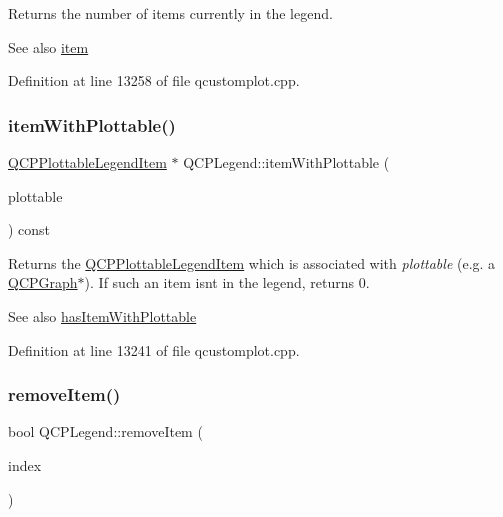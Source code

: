 Returns the number of items currently in the legend. \begin{DoxySeeAlso}{See also}
\hyperlink{class_q_c_p_legend_acfe9694c45104a3359d3806ed366fcf7}{item} 
\end{DoxySeeAlso}


Definition at line 13258 of file qcustomplot.\+cpp.

\mbox{\label{class_q_c_p_legend_a91e790002d8bf15a20628a8e8841e397}} 
\subsubsection{\texorpdfstring{item\+With\+Plottable()}{itemWithPlottable()}}
{\footnotesize\ttfamily \hyperlink{class_q_c_p_plottable_legend_item}{Q\+C\+P\+Plottable\+Legend\+Item} $\ast$ Q\+C\+P\+Legend\+::item\+With\+Plottable (\begin{DoxyParamCaption}\item[{const \hyperlink{class_q_c_p_abstract_plottable}{Q\+C\+P\+Abstract\+Plottable} $\ast$}]{plottable }\end{DoxyParamCaption}) const}

Returns the \hyperlink{class_q_c_p_plottable_legend_item}{Q\+C\+P\+Plottable\+Legend\+Item} which is associated with {\itshape plottable} (e.\+g. a \hyperlink{class_q_c_p_graph}{Q\+C\+P\+Graph}$\ast$). If such an item isn\textquotesingle{}t in the legend, returns 0.

\begin{DoxySeeAlso}{See also}
\hyperlink{class_q_c_p_legend_a4b90a442af871582df85c2bc13f91e88}{has\+Item\+With\+Plottable} 
\end{DoxySeeAlso}


Definition at line 13241 of file qcustomplot.\+cpp.

\mbox{\label{class_q_c_p_legend_ac91595c3eaa746fe6321d2eb952c63bb}} 
\subsubsection{\texorpdfstring{remove\+Item()}{removeItem()}\hspace{0.1cm}{\footnotesize\ttfamily [1/2]}}
{\footnotesize\ttfamily bool Q\+C\+P\+Legend\+::remove\+Item (\begin{DoxyParamCaption}\item[{int}]{index }\end{DoxyParamCaption})}

